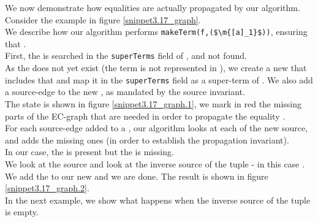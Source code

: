 \bigskip

\noindent
We now demonstrate how equalities are actually propagated by our algorithm.
Consider the example in figure \ref{snippet3.17_graph}.\\
We describe how our algorithm performs \lstinline|makeTerm(f,($\m{[a]_1}$))|, ensuring that .\\
First, the \GFA{}  is searched in the \lstinline|superTerms| field of , and not found.\\
As the \GFA{} does not yet exist (the term  is not represented in ), we create a new \GT{} that includes that \GFA{} and map it in the \lstinline|superTerms| field as a super-term of . We also add a source-edge to the new \GT{}, as mandated by the source invariant.\\
The state is shown in figure \ref{snippet3.17_graph.1}, we mark in red the missing parts of the EC-graph that are needed in order to propagate the equality .\\
For each source-edge added to a \GT{}, our algorithm looks at each \GFA{} of the new source, and adds the missing ones (in order to establish the propagation invariant).\\
In our case, the \GFA{}  is present but the \GFA{}  is missing.\\
We look at the source \GFA{}  and look at the inverse source of the tuple  - in this case .\\
We add the \GFA{}  to our new \GT{} and we are done. The result is shown in figure \ref{snippet3.17_graph.2}.\\
In the next example, we show what happens when the inverse source of the tuple is empty.



